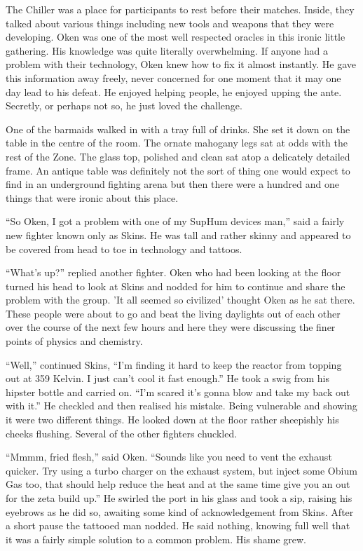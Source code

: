 The Chiller was a place for participants to rest before their matches. Inside, they talked about various things including new tools and weapons that they were developing. Oken was one of the most well respected oracles in this ironic little gathering. His knowledge was quite literally overwhelming. If anyone had a problem with their technology, Oken knew how to fix it almost instantly. He gave this information away freely, never concerned for one moment that it may one day lead to his defeat. He enjoyed helping people, he enjoyed upping the ante. Secretly, or perhaps not so, he just loved the challenge.

One of the barmaids walked in with a tray full of drinks. She set it down on the table in the centre of the room. The ornate mahogany legs sat at odds with the rest of the Zone. The glass top, polished and clean sat atop a delicately detailed frame. An antique table was definitely not the sort of thing one would expect to find in an underground fighting arena but then there were a hundred and one things that were ironic about this place.

``So Oken, I got a problem with one of my SupHum devices man,'' said a fairly new fighter known only as Skins. He was tall and rather skinny and appeared to be covered from head to toe in technology and tattoos.

``What's up?'' replied another fighter. Oken who had been looking at the floor turned his head to look at Skins and nodded for him to continue and share the problem with the group. 'It all seemed so civilized' thought Oken as he sat there. These people were about to go and beat the living daylights out of each other over the course of the next few hours and here they were discussing the finer points of physics and chemistry.

``Well,'' continued Skins, ``I'm finding it hard to keep the reactor from topping out at 359 Kelvin. I just can't cool it fast enough.'' He took a swig from his hipster bottle and carried on. ``I'm scared it's gonna blow and take my back out with it.'' He checkled and then realised his mistake. Being vulnerable and showing it were two different things. He looked down at the floor rather sheepishly his cheeks flushing. Several of the other fighters chuckled.

``Mmmm, fried flesh,'' said Oken. ``Sounds like you need to vent the exhaust quicker. Try using a turbo charger on the exhaust system, but inject some Obium Gas too, that should help reduce the heat and at the same time give you an out for the zeta build up.'' He swirled the port in his glass and took a sip, raising his eyebrows as he did so, awaiting some kind of acknowledgement from Skins. After a short pause the tattooed man nodded. He said nothing, knowing full well that it was a fairly simple solution to a common problem. His shame grew.

